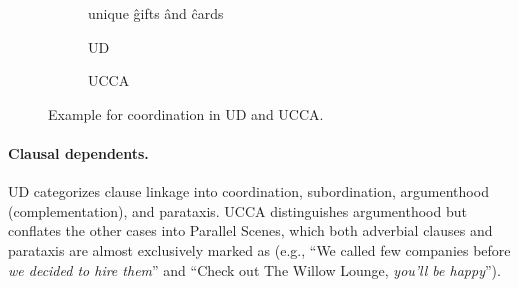 \documentclass[11pt,a4paper]{article}
\begin{document}
\begin{figure}[th]
  \centering
\begin{subfigure}{.45\columnwidth}
    \begin{dependency}[text only label, label style={above,font=\tt}, font=\small, edge unit distance=1.5ex]
    \begin{deptext}[column sep=.1em,ampersand replacement=\^]
    unique \^ gifts \^ and \^ cards \\
    \end{deptext}
    \end{dependency}
    \caption{UD\label{fig:conj_ud}}
\end{subfigure}
\hfill
\begin{subfigure}{.45\columnwidth}
    \caption{UCCA\label{fig:conj_ucca}}
 \end{subfigure}
 \caption{Example for coordination in UD and UCCA.\label{fig:conj}}
\end{figure}


\paragraph{Clausal dependents.}
UD categorizes clause linkage into coordination,
subordination, argumenthood (complementation),
and parataxis. %
UCCA distinguishes argumenthood 
but conflates the other cases into Parallel Scenes,
which both adverbial clauses and parataxis
are almost exclusively marked as
(e.g., ``We called few companies before \textit{we decided to hire them}''
and ``Check out The Willow Lounge, \textit{you'll be happy}'').
\end{document}
